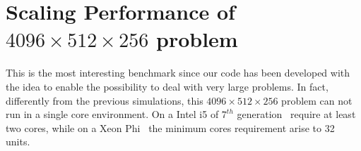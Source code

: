 \section{Scaling Performance of $4096\times512\times256$ problem}
This is the most interesting benchmark since our code has been developed with the idea to enable the possibility to deal with very large problems.
In fact, differently from the previous simulations, this $4096\times 512 \times 256$ problem can not run in a single core environment.
On a Intel i5 of $7^{th}$ generation~\cite{intel:i5} require at least two cores, while on a Xeon Phi~\cite{intel:xeonphi} the minimum cores requirement arise to 32 units.